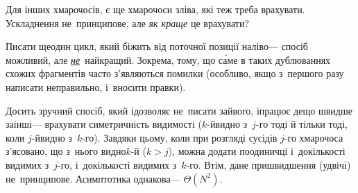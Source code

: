 Для інших хмарочосів, є ще хмарочоси зліва, які теж треба врахувати. Ускладнення не~принципове, але \emph{як краще} це врахувати?

Писати ще\nolinebreak[3] один цикл, який біжить від поточної позиції наліво\nolinebreak[3] --- спосіб можливий, але \underline{\emph{не}}~найкращий. Зокрема, тому, що с\'{а}ме в таких дублюваннях схожих фрагментів часто з'являються помилки (особливо, якщо з~першого разу написати неправильно, і~вносити правки).

Досить зручний спосіб, який і\nolinebreak[3] дозволяє не~писати зайвого, і\nolinebreak[3] працює дещо швидше за\nolinebreak[2] інші\nolinebreak[3] --- врахувати симетричність видимості (\mbox{$k$-й}\nolinebreak[3] видно з~\mbox{$j$-го} тоді й тільки тоді, коли \mbox{$j$-й}\nolinebreak[3] видно з~\mbox{$k$-го}). Завдяки цьому, коли при розгляді сусідів \mbox{$j$-го} хмарочоса з'ясовано, що з~нього видно\nolinebreak[2] \mbox{$k$-й} (${k{>}j}$), можна додати по\nolinebreak[3] одиничці і~до\nolinebreak[2] кількості видимих з~\mbox{$j$-го}, і~до\nolinebreak[2] кількості видимих з~\mbox{$k$-го}.
Втім, дане пришвидшення (удвічі) не~принципове. Асимптотика однакова\nolinebreak[3] --- $\Theta(N^2)$.

